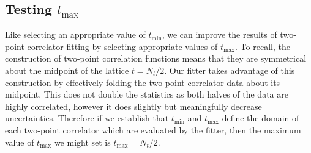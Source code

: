 
\subsection{Testing $t_\mathrm{max}$}
Like selecting an appropriate value of $t_\mathrm{min}$, we can improve the results of two-point correlator fitting by selecting appropriate values of $t_\mathrm{max}$.  To recall, the construction of two-point correlation functions means that they are symmetrical about the midpoint of the lattice $t=N_t/2$.  Our fitter takes advantage of this construction by effectively folding the two-point correlator data about its midpoint.  This does not double the statistics as both halves of the data are highly correlated, however it does slightly but meaningfully decrease uncertainties.  Therefore if we establish that $t_\mathrm{min}$ and $t_\mathrm{max}$ define the domain of each two-point correlator which are evaluated by the fitter, then the maximum value of $t_\mathrm{max}$ we might set is $t_\mathrm{max} = N_t/2$.  

